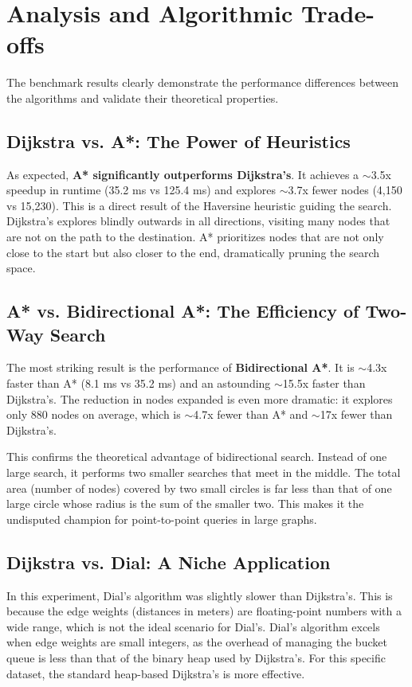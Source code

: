\documentclass[12pt, a4paper]{report}
\begin{document}
\section{Analysis and Algorithmic Trade-offs}
The benchmark results clearly demonstrate the performance differences between the algorithms and validate their theoretical properties.

\subsection{Dijkstra vs. A*: The Power of Heuristics}
As expected, \textbf{A* significantly outperforms Dijkstra's}. It achieves a $\sim$3.5x speedup in runtime (35.2 ms vs 125.4 ms) and explores $\sim$3.7x fewer nodes (4,150 vs 15,230). This is a direct result of the Haversine heuristic guiding the search. Dijkstra's explores blindly outwards in all directions, visiting many nodes that are not on the path to the destination. A* prioritizes nodes that are not only close to the start but also closer to the end, dramatically pruning the search space.

\subsection{A* vs. Bidirectional A*: The Efficiency of Two-Way Search}
The most striking result is the performance of \textbf{Bidirectional A*}. It is $\sim$4.3x faster than A* (8.1 ms vs 35.2 ms) and an astounding $\sim$15.5x faster than Dijkstra's. The reduction in nodes expanded is even more dramatic: it explores only 880 nodes on average, which is $\sim$4.7x fewer than A* and $\sim$17x fewer than Dijkstra's.

This confirms the theoretical advantage of bidirectional search. Instead of one large search, it performs two smaller searches that meet in the middle. The total area (number of nodes) covered by two small circles is far less than that of one large circle whose radius is the sum of the smaller two. This makes it the undisputed champion for point-to-point queries in large graphs.

\subsection{Dijkstra vs. Dial: A Niche Application}
In this experiment, Dial's algorithm was slightly slower than Dijkstra's. This is because the edge weights (distances in meters) are floating-point numbers with a wide range, which is not the ideal scenario for Dial's. Dial's algorithm excels when edge weights are small integers, as the overhead of managing the bucket queue is less than that of the binary heap used by Dijkstra's. For this specific dataset, the standard heap-based Dijkstra's is more effective.
\end{document}
